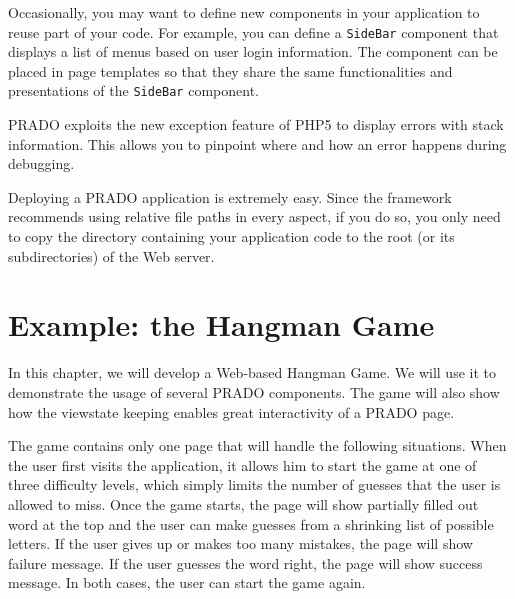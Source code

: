 \documentclass{book}
\begin{document}
Occasionally, you may want to define new components in your
application to reuse part of your code. For example, you can
define a \verb|SideBar| component that displays a list of menus
based on user login information. The component can be placed in
page templates so that they share the same functionalities and
presentations of the \verb|SideBar| component.


PRADO exploits the new exception feature of PHP5 to display errors
with stack information. This allows you to pinpoint where and how
an error happens during debugging.


Deploying a PRADO application is extremely easy. Since the
framework recommends using relative file paths in every aspect, if
you do so, you only need to copy the directory containing your
application code to the root (or its subdirectories) of the Web
server.


\chapter{Example: the Hangman Game}

In this chapter, we will develop a Web-based Hangman Game. We will
use it to demonstrate the usage of several PRADO components. The
game will also show how the viewstate keeping enables great
interactivity of a PRADO page.


The game contains only one page that will handle the following
situations. When the user first visits the application, it allows
him to start the game at one of three difficulty levels, which
simply limits the number of guesses that the user is allowed to
miss. Once the game starts, the page will show partially filled
out word at the top and the user can make guesses from a shrinking
list of possible letters. If the user gives up or makes too many
mistakes, the page will show failure message. If the user guesses
the word right, the page will show success message. In both cases,
the user can start the game again.
\end{document}
